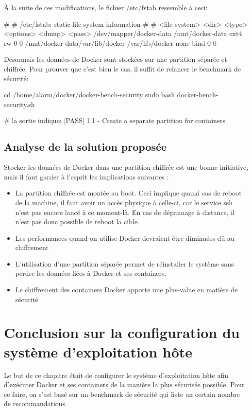 \documentclass[11pt,a4paper,oneside]{report}
\begin{document}
À la suite de ces modifications, le fichier /etc/fstab ressemble à ceci:
\begin{bashcode}
#
# /etc/fstab: static file system information
#
# <file system> <dir>   <type>  <options>       <dump>  <pass>
/dev/mapper/docker-data /mnt/docker-data ext4 rw 0 0
/mnt/docker-data/var/lib/docker /var/lib/docker none bind 0 0
\end{bashcode}


Désormais les données de Docker sont stockées sur une partition séparée et chiffrée. Pour prouver que c'est bien le cas, il suffit de relancer le benchmark de sécurité:

\begin{bashcode}
cd /home/alarm/docker/docker-bench-security
sudo bash docker-bench-security.sh

# la sortie indique:
[PASS] 1.1  - Create a separate partition for containers
\end{bashcode}


\subsection{Analyse de la solution proposée}
Stocker les données de Docker dans une partition chiffrée est une bonne initiative, mais il faut garder à l'esprit les implications suivantes :
\begin{itemize}

\item La partition chiffrée est montée au boot. Ceci implique quand cas de reboot de la machine, il faut avoir un accès physique à celle-ci, car le service ssh n'est pas encore lancé à ce moment-là. En cas de dépannage à distance, il n'est pas donc possible de reboot la cible.
\item Les performances quand on utilise Docker devraient être diminuées dû au chiffrement
\item L'utilisation d'une partition séparée permet de réinstaller le système sans perdre les données liées à Docker et ses containers.
\item Le chiffrement des containers Docker apporte une plus-value en matière de sécurité
\end{itemize}

\section{Conclusion sur la configuration du système d'exploitation hôte}
Le but de ce chapitre était de configurer le système d'exploitation hôte afin d'exécuter Docker et ses containers de la manière la plus sécurisée possible. Pour ce faire, on s'est basé sur un benchmark de sécurité qui liste un certain nombre de recommandations.
\end{document}
